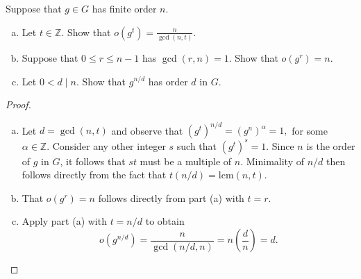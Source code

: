 \documentclass[10pt]{amsart}
\begin{document}
\begin{thm}
	Suppose that $g \in G$ has finite order $n$.
	\begin{enumerate}[(a)]
			\item
                          Let $t \in \mathbb{Z}$.  Show that $o(g^t) = \displaystyle{\frac{n}{\gcd(n,t)}}.$
			\item
                          Suppose that $0 \leq r \leq n-1$ has $\gcd(r,n) = 1$.  Show that $o(g^r) = n$.
			\item 
                          Let $0 < d \mid n$.  Show that $g^{n/d}$ has order $d$ in $G$.
	\end{enumerate}
	\begin{proof}
          \begin{enumerate}[(a)]
            \item
              Let $d = \gcd(n,t)$ and observe that $(g^t)^{n/d} = (g^n)^\alpha = 1,$ for some $\alpha \in \mathbb{Z}$.
              Consider any other integer $s$ such that $(g^t)^s = 1$.
              Since $n$ is the order of $g$ in $G$, it follows that $st$ must be a multiple of $n$.
              Minimality of $n/d$ then follows directly from the fact that $t(n/d) = \text{lcm}(n,t).$
            \item
              That $o(g^r) = n$ follows directly from part (a) with $t = r$.
            \item
              Apply part (a) with $t = n/d$ to obtain $$o(g^{n/d}) = \frac{n}{\gcd(n/d,n)} = n\left(\frac{d}{n}\right) = d.$$
        \end{enumerate}
	\end{proof}
\end{thm}
\end{document}
